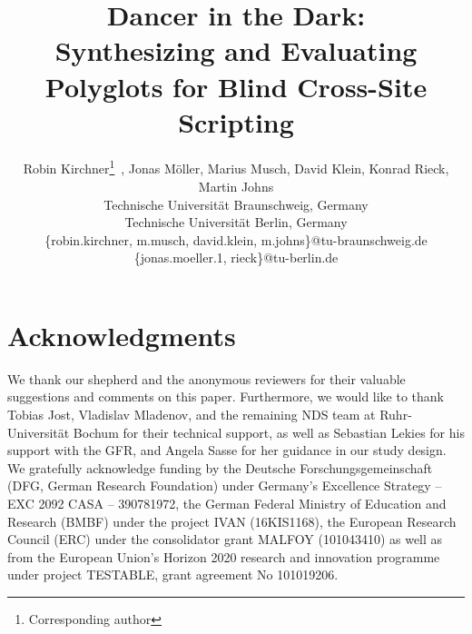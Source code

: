 \documentclass[letterpaper, twocolumn, 10pt]{article}
\begin{document}
\date{}

\title{\Large \bf Dancer in the Dark:\\ 
  Synthesizing and Evaluating Polyglots for Blind Cross-Site Scripting}


\author{
{\rm Robin Kirchner\thanks{Corresponding author}~\hspace{2px}\textsuperscript{\textdagger}, Jonas Möller\hspace{1px}\textsuperscript{\textdaggerdbl}, Marius Musch\textsuperscript{\textdagger}, David Klein\textsuperscript{\textdagger}, Konrad Rieck\hspace{1px}\textsuperscript{\textdaggerdbl}, Martin Johns\textsuperscript{\textdagger}}\\[0.5em]
\textsuperscript{\rm \textdagger} Technische Universität Braunschweig, Germany\\
\textsuperscript{\rm \textdaggerdbl} Technische Universität Berlin, Germany\\[0.5em]
\{robin.kirchner, m.musch, david.klein, m.johns\}@tu-braunschweig.de\\
\{jonas.moeller.1, rieck\}@tu-berlin.de
} %

\maketitle












\section*{Acknowledgments}
We thank our shepherd and the anonymous reviewers for their valuable suggestions and comments on this paper. 
Furthermore, we would like to thank Tobias Jost, Vladislav Mladenov, and the remaining NDS team at Ruhr-Universität Bochum for their technical support, as well as Sebastian Lekies for his support with the GFR, and Angela Sasse for her guidance in our study design.
We gratefully acknowledge funding by the Deutsche Forschungsgemeinschaft (DFG, German Research Foundation) under Germany's Excellence Strategy -- EXC 2092 CASA -- 390781972, the German Federal Ministry of Education and Research (BMBF) under the project IVAN (16KIS1168), the European Research Council (ERC) under the consolidator grant MALFOY (101043410) as well as from the European Union's Horizon 2020 research and innovation programme under project TESTABLE, grant agreement No 101019206.
\end{document}
